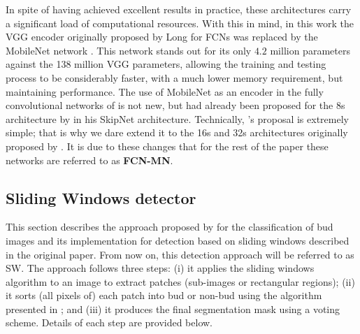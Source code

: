 \documentclass[a4paper,authoryear,review]{elsarticle}
\begin{document}
In spite of having achieved excellent results in practice, these architectures carry a significant load of computational resources. With this in mind, in this work the VGG encoder \citet{Simonyan2015VeryDC} originally proposed by Long for FCNs was replaced by the MobileNet network \citet{howard2017mobilenets}. This network stands out for its only $4.2$ million parameters against the 138 million VGG parameters, allowing the training and testing process to be considerably faster, with a much lower memory requirement, but maintaining performance. The use of MobileNet as an encoder in the fully convolutional networks of \citet{long2015fully} is not new, but had already been proposed for the 8s architecture by \citet{siam2018rtseg} in his SkipNet architecture. Technically, \citet{siam2018rtseg}’s proposal is extremely simple; that is why we dare extend it to the 16s and 32s architectures originally proposed by \citep{long2015fully}. It is due to these changes that for the rest of the paper these networks are referred to as \textbf{FCN-MN}.

\subsection{Sliding Windows detector}
\label{sec:sw}

This section describes the approach proposed by \citet{perez2017image} for the classification of bud images and its implementation for detection based on sliding windows described in the original paper. From now on, this detection approach will be referred to as SW. The approach follows three steps: (i) it applies the sliding windows algorithm to an image to extract patches (sub-images or rectangular regions); (ii) it sorts (all pixels of) each patch into bud or non-bud using the algorithm presented in \citet{perez2017image}; and (iii) it produces the final segmentation mask using a voting scheme. Details of each step are provided below.
\end{document}
